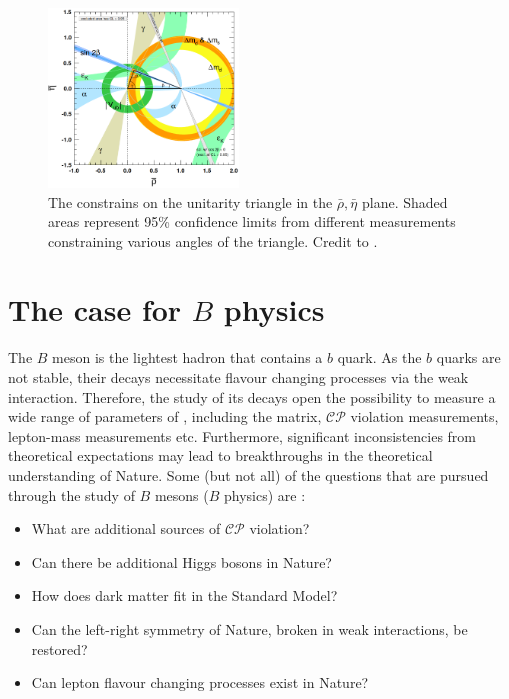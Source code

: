 \begin{figure}
    \centering
    \includegraphics[width=0.45\textwidth]{figures/sm_theory/unitarity_triangle.png}
    \caption{\label{fig:unitarity_triangle}The constrains on the unitarity triangle in the $\bar{\rho},\bar{\eta}$ plane.
    Shaded areas represent  95\% confidence limits from different measurements constraining various angles of the triangle.
    Credit to \cite{Workman:2022ynf}.
    }
\end{figure}

\section{The case for \texorpdfstring{$B$}{B} physics}\label{sec:bphysics_case}

The $B$ meson is the lightest hadron that contains a $b$ quark.
As the $b$ quarks are not stable, their decays necessitate flavour changing processes via the weak interaction.
Therefore, the study of its decays open the possibility to measure a wide range of parameters of \SM, including the \CKM matrix, $\mathcal{CP}$ violation measurements, lepton-mass measurements etc.
Furthermore, significant inconsistencies from theoretical expectations may lead to breakthroughs in the theoretical understanding of Nature.
Some (but not all) of the questions that are pursued through the study of $B$ mesons ($B$ physics) are \cite{Belle-II:2018jsg}:
\begin{itemize}
    \item What are additional sources of $\mathcal{CP}$ violation?
    \item Can there be additional Higgs bosons in Nature?
    \item How does dark matter fit in the Standard Model?
    \item Can the left-right symmetry of Nature, broken in weak interactions, be restored?
    \item Can lepton flavour changing processes exist in Nature?
\end{itemize}


